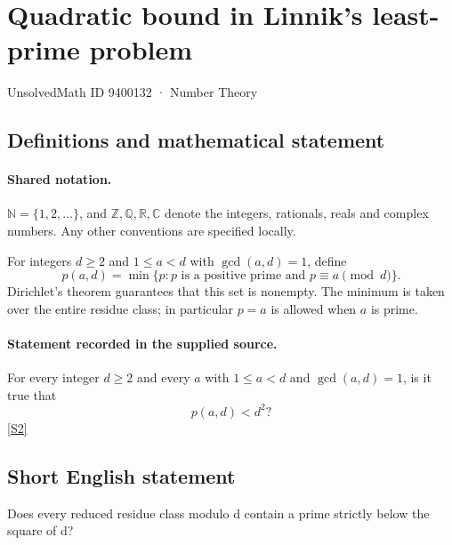 \documentclass[11pt]{article}
\newcommand{\sref}[2]{\hyperlink{source:#1:#2}{[S#2]}}
\begin{document}
\setcounter{section}{9400131}
\section{Quadratic bound in Linnik's least-prime problem}\label{9400132}
{\small\sffamily UnsolvedMath ID 9400132 · Number Theory}
\subsection{Definitions and mathematical statement}

\paragraph{Shared notation.}$\mathbb N=\{1,2,\ldots\}$, and $\mathbb Z,\mathbb Q,\mathbb R,\mathbb C$ denote the integers, rationals, reals and complex numbers. Any other conventions are specified locally.


For integers $d\ge2$ and $1\le a<d$ with $\gcd(a,d)=1$, define
\[p(a,d)=\min\{p:p\text{ is a positive prime and }p\equiv a\pmod d\}.\]
Dirichlet's theorem guarantees that this set is nonempty. The minimum is taken over the entire residue class; in particular $p=a$ is allowed when $a$ is prime.
\paragraph{Statement recorded in the supplied source.}
For every integer $d\ge2$ and every $a$ with $1\le a<d$ and $\gcd(a,d)=1$, is it true that
\[p(a,d)<d^2?\] \sref{9400132}{2}
\subsection{Short English statement}
Does every reduced residue class modulo d contain a prime strictly below the square of d?
\end{document}
